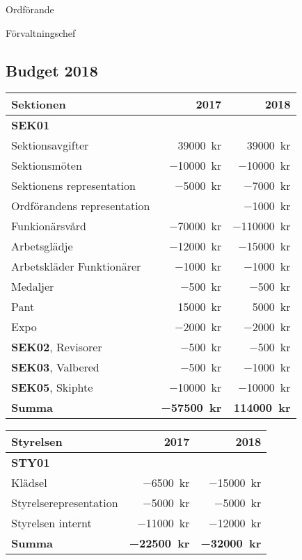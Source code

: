 \documentclass[../_main/handlingar.tex]{subfiles}
\begin{document}
\begin{signatures}{2}
    \ist
    \signature{\ordf}{Ordförande}
    \signature{\fvc}{Förvaltningschef}
\end{signatures}

\newpage
\subsection*{Budget 2018}
\begin{tabularx}{10cm}{X r r}
    \textbf{\large Sektionen} & \textbf{2017} & \textbf{2018} \\
    \hline
    \textbf{SEK01} \\
    Sektionsavgifter & \SI{39000}{kr} & \SI{39000}{kr} \\
    Sektionsmöten & \SI{-10000}{kr} & \SI{-10000}{kr} \\
    Sektionens representation & \SI{-5000}{kr} & \SI{-7000}{kr} \\
    Ordförandens representation & & \SI{-1000}{kr} \\
    Funkionärsvård & \SI{-70000}{kr} & \SI{-110000}{kr} \\
    Arbetsglädje & \SI{-12000}{kr} & \SI{-15000}{kr} \\
    Arbetskläder Funktionärer & \SI{-1000}{kr} & \SI{-1000}{kr} \\
    Medaljer & \SI{-500}{kr} & \SI{-500}{kr} \\
    Pant & \SI{15000}{kr} & \SI{5000}{kr} \\
    Expo & \SI{-2000}{kr} & \SI{-2000}{kr} \\
    \textbf{SEK02}, Revisorer & \SI{-500}{kr} & \SI{-500}{kr} \\
    \textbf{SEK03}, Valbered & \SI{-500}{kr} & \SI{-1000}{kr} \\
    \textbf{SEK05}, Skiphte & \SI{-10000}{kr} & \SI{-10000}{kr} \\
    \hline
    \textbf{Summa} & \textbf{\SI{-57500}{kr}} & \textbf{\SI{114000}{kr}} \\
\end{tabularx}

\begin{tabularx}{10cm}{X r r}
    \textbf{\large Styrelsen} & \textbf{2017} & \textbf{2018} \\
    \hline
    \textbf{STY01} \\
    Klädsel & \SI{-6500}{kr} & \SI{-15000}{kr} \\
    Styrelserepresentation & \SI{-5000}{kr} & \SI{-5000}{kr} \\
    Styrelsen internt & \SI{-11000}{kr} & \SI{-12000}{kr} \\
    \hline
    \textbf{Summa} & \textbf{\SI{-22500}{kr}} & \textbf{\SI{-32000}{kr}} \\
\end{tabularx}
\end{document}

